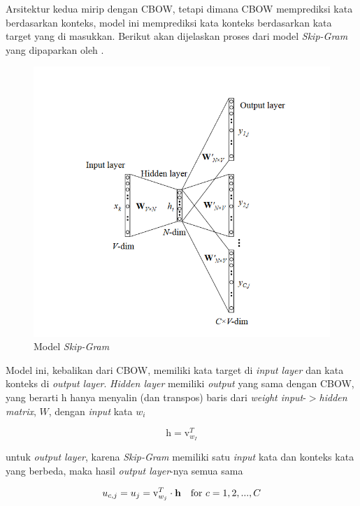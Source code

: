 \documentclass[12pt]{report}
\begin{document}
\begin{enumerate}
Arsitektur kedua mirip dengan CBOW, tetapi dimana CBOW memprediksi kata berdasarkan konteks, model ini memprediksi kata konteks berdasarkan kata target yang di masukkan. Berikut akan dijelaskan proses dari model \textit{Skip-Gram} yang dipaparkan oleh .

\begin{figure}[H]
\centering
\includegraphics[scale=0.75]{modelskipgram}
\caption{Model \textit{Skip-Gram}}
\label{modelskipgram}
\end{figure}

Model ini, kebalikan dari CBOW, memiliki kata target di \textit{input layer} dan kata konteks di \textit{output layer}. \textit{Hidden layer} memiliki \textit{output} yang sama dengan CBOW, yang berarti h hanya menyalin (dan transpos) baris dari \textit{weight input}-$>$\textit{hidden matrix}, $W$, dengan \textit{input} kata $w_i$

\begin{equation}
\text{h} = \text{v}_{w_I}^T \label{eq9}
\end{equation}

untuk \textit{output layer}, karena \textit{Skip-Gram} memiliki satu \textit{input} kata dan konteks kata yang berbeda, maka hasil \textit{output layer}-nya semua sama

\begin{align}
u_{c,j} = u_j = \text{v}_{w_j}^T \cdot \text{\textbf{h}} && \text{for $c$} = 1, 2, ..., C \label{eq10}
\end{align}


\end{enumerate}
\end{document}
